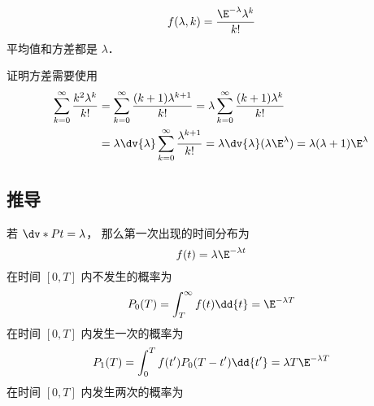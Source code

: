 
\begin{issues}
\issueDraft
\end{issues}

\begin{equation}
f(\lambda, k) = \frac{\E^{-\lambda}\lambda^k}{k!}
\end{equation}
平均值和方差都是 $\lambda$．

证明方差需要使用
\begin{equation}
\begin{aligned}
\sum_{k=0}^\infty \frac{k^2\lambda^{k}}{k!}
&= \sum_{k=0}^\infty \frac{(k+1)\lambda^{k+1}}{k!}
= \lambda \sum_{k=0}^\infty \frac{(k+1)\lambda^k}{k!}\\
&= \lambda\dv{\lambda} \sum_{k=0}^\infty \frac{\lambda^{k+1}}{k!}
= \lambda \dv{\lambda} (\lambda \E^{\lambda})
= \lambda(\lambda+1)\E^{\lambda}
\end{aligned}
\end{equation}

\subsection{推导}
若 $\dv*{P}{t} = \lambda$， 那么第一次出现的时间分布为
\begin{equation}
f(t) = \lambda\E^{-\lambda t}
\end{equation}
在时间 $[0,T]$ 内不发生的概率为
\begin{equation}
P_0(T) = \int_{T}^\infty f(t) \dd{t} = \E^{-\lambda T}
\end{equation}
在时间 $[0,T]$ 内发生一次的概率为
\begin{equation}
P_1(T) = \int_{0}^{T} f(t') P_0(T-t')\dd{t'} = \lambda T \E^{-\lambda T}
\end{equation}
在时间 $[0,T]$ 内发生两次的概率为
